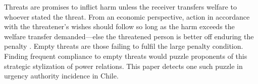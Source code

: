 \documentclass[letter,12pt]{article}
\begin{document}


\onehalfspacing

\noindent Threats are promises to inflict harm unless the receiver transfers welfare to whoever stated the threat. From an economic perspective, action in accordance with the threatener's wishes should follow so long as the harm exceeds the welfare transfer demanded---else the threatened person is better off enduring the penalty \citep{dahl.ConceptPower1957,friedrich.1941,schelling.1960}. Empty threats are those failing to fulfil the large penalty condition. Finding frequent compliance to empty threats would puzzle proponents of this strategic stylization of power relations. This paper detects one such puzzle in urgency authority incidence in Chile. 
\end{document}
